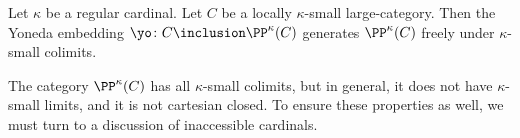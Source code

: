 \begin{proposition}%
	\label{prp:PPkappaisfreelygenerated}
	Let $ \kappa $ be a regular cardinal.
	Let $ C $ be a locally $\kappa$-small large-category.
	Then the Yoneda embedding
	$ \yo \colon C \inclusion \PP^{\kappa}(C) $
	generates $ \PP^{\kappa}(C) $ freely under
	$ \kappa $-small colimits.
\end{proposition}

\begin{nul}
	The category $ \PP^{\kappa}(C) $
	has all $ \kappa $-small colimits, but
	in general, it does not have $ \kappa $-small limits, and
	it is not cartesian closed.
	To ensure these properties as well,
	we must turn to a discussion of inaccessible cardinals.
\end{nul}


